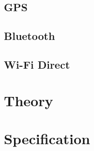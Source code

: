 \documentclass[twocolumn]{article}
\begin{document}





\subsection{GPS}\label{sec:gps} %



\subsection{Bluetooth}\label{sec:bluetooth} %


\subsection{Wi-Fi Direct}\label{sec:wifi-direct} %


\section{Theory}\label{sec:theory} %




\section{Specification}\label{sec:specification} %

\end{document}
